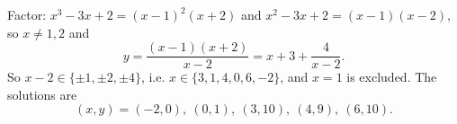 Factor: $x^3-3x+2=(x-1)^2(x+2)$ and $x^2-3x+2=(x-1)(x-2)$, so $x\ne1,2$ and
\[y=\dfrac{(x-1)(x+2)}{x-2}=x+3+\dfrac{4}{x-2}.\]
So $x-2\in\{\pm1,\pm2,\pm4\}$, i.e. $x\in\{3,1,4,0,6,-2\}$, and $x=1$ is excluded. The solutions are
\[(x,y)=\boxed{(-2,0),\ (0,1),\ (3,10),\ (4,9),\ (6,10)}.\]
